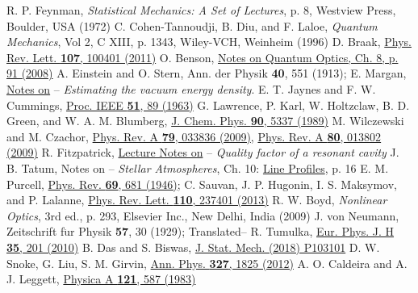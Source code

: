 \documentclass[aps,pra,twocolumn,showpacs,preprintnumbers,amsmath,amssymb,footinbib]{revtex4}
\def\prv#1#2#3{Phys. Rev. {\bf #1}, #2 (#3)}
\def\prl#1#2#3{Phys. Rev. Lett. {\bf #1}, #2 (#3)}
\def\pra#1#2#3{Phys. Rev. A {\bf #1}, #2 (#3)}
\def\jcp#1#2#3{J. Chem. Phys. {\bf #1}, #2 (#3)}
\begin{document}
\begin{thebibliography}{99}
R. P. Feynman, \textit{Statistical Mechanics: A Set of Lectures}, p. 8, Westview Press, Boulder, USA (1972)
C. Cohen-Tannoudji, B. Diu, and F. Laloe, \textit{Quantum Mechanics}, Vol 2, C XIII, p. 1343, Wiley-VCH, Weinheim (1996)
D. Braak,  \href{http://dx.doi.org/10.1103/PhysRevLett.107.100401}{\prl{107}{100401}{2011}}
O. Benson, \href{https://www.physik.hu-berlin.de/de/nano/lehre/quantenoptik08}{Notes on Quantum Optics, Ch. 8, p. 91 (2008)}
A. Einstein and O. Stern, Ann. der Physik \textbf{40}, 551  (1913); E. Margan, \href{http://www-f9.ijs.si/~margan/Articles/vacuum_energy_density.pdf}{Notes on} -- \textit{Estimating the vacuum energy density}.
E. T. Jaynes and F. W. Cummings,  \href{http://dx.doi.org/10.1109/PROC.1963.1664.}{Proc. IEEE \textbf{51}, 89 (1963)}
G. Lawrence, P. Karl, W. Holtzclaw, B. D. Green, and W. A. M. Blumberg, \href{http://dx.doi.org/10.1063/1.456439}{\jcp{90}{5337}{1989}}
M. Wilczewski and M. Czachor, \href{http://dx.doi.org/10.1103/PhysRevA.79,033836}{\pra{79}{033836}{2009}}, \href{http://dx.doi.org/10.1103/PhysRevA.80,013802}{\pra{80}{013802}{2009}}
R. Fitzpatrick,  \href{https://farside.ph.utexas.edu/teaching/jk1/lectures/node114.html}{Lecture Notes on} -- \textit{Quality factor of a resonant cavity}
J. B. Tatum, Notes on -- \textit{Stellar Atmospheres}, Ch. 10: \href{http://orca.phys.uvic.ca/~tatum/stellatm/atm10.pdf}{Line Profiles}, p. 16
E. M. Purcell, \href{https://journals.aps.org/pr/pdf/10.1103/PhysRev.69.674.2}{\prv{69}{681}{1946}}; C. Sauvan, J. P. Hugonin, I. S. Maksymov, and P. Lalanne,  \href{http://dx.doi.org/10.1103/PhysRevLett.110.237401}{\prl{110}{237401}{2013}} 
R. W. Boyd, \textit{Nonlinear Optics}, 3rd ed., p. 293, Elsevier Inc., New Delhi, India (2009)
J. von Neumann, Zeitschrift f$\ddot{\text{u}}$r Physik \textbf{57}, 30 (1929); Translated-- R. Tumulka, \href{http://dx.doi.org/10.1140/epjh/e2010-00008-5}{Eur. Phys. J. H \textbf{35}, 201 (2010)}
B. Das and S. Biswas, \href{http://dx.doi.org/10.1088/1742-5468/aae029}{J. Stat. Mech. (2018) P103101}
D. W. Snoke, G. Liu, S. M. Girvin, \href{http://dx.doi.org/10.1016/j.aop.2011.12.016}{Ann. Phys. \textbf{327}, 1825 (2012)}
A. O. Caldeira and A. J. Leggett, \href{https://doi.org/10.1016/0378-4371(83)90013-4}{Physica A \textbf{121}, 587 (1983)}

\end{thebibliography}
\end{document}
